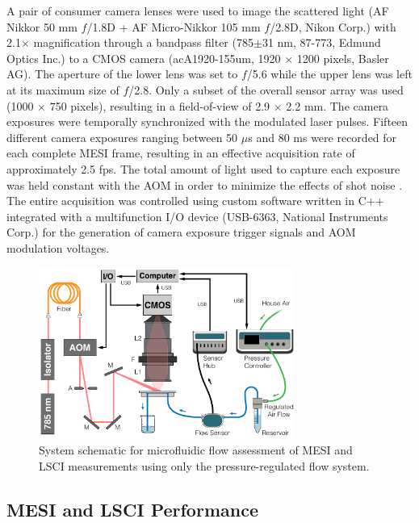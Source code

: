 \documentclass[12pt]{spieman}
\begin{document}
\begin{spacing}{2}
A pair of consumer camera lenses were used to image the scattered light (AF Nikkor 50 mm $f$/1.8D + AF Micro-Nikkor 105 mm $f$/2.8D, Nikon Corp.) with 2.1$\times$ magnification through a bandpass filter (785$\pm$31 nm, 87-773, Edmund Optics Inc.) to a CMOS camera (acA1920-155um, 1920 $\times$ 1200 pixels, Basler AG). The aperture of the lower lens was set to $f$/5.6 while the upper lens was left at its maximum size of $f$/2.8. Only a subset of the overall sensor array was used (1000 $\times$ 750 pixels), resulting in a field-of-view of 2.9 $\times$ 2.2 mm. The camera exposures were temporally synchronized with the modulated laser pulses. Fifteen different camera exposures ranging between 50 $\mu$s and 80 ms were recorded for each complete MESI frame, resulting in an effective acquisition rate of approximately 2.5 fps. The total amount of light used to capture each exposure was held constant with the AOM in order to minimize the effects of shot noise \cite{Parthasarathy:2008el}. The entire acquisition was controlled using custom software written in C++ integrated with a multifunction I/O device (USB-6363, National Instruments Corp.) for the generation of camera exposure trigger signals and AOM modulation voltages.

\begin{figure}
    \centering
    \includegraphics[width=0.75\textwidth]{Figure3.pdf}
    \caption {
        System schematic for microfluidic flow assessment of MESI and LSCI measurements using only the pressure-regulated flow system.
    }
    \label{fig:system_mesi}
\end{figure}


\subsection{MESI and LSCI Performance}


\end{spacing}
\end{document}
